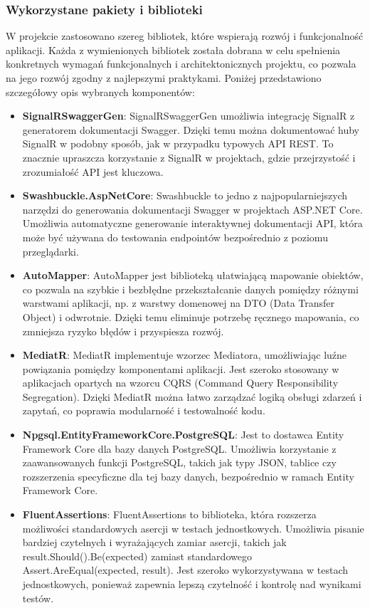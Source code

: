 \documentclass[12pt,a4paper]{article}
\begin{document}
\newpage

\subsubsection{Wykorzystane pakiety i biblioteki}

W projekcie zastosowano szereg bibliotek, które wspierają rozwój i funkcjonalność aplikacji. Każda z wymienionych bibliotek została dobrana w celu spełnienia konkretnych wymagań funkcjonalnych i architektonicznych projektu, co pozwala na jego rozwój zgodny z najlepszymi praktykami. Poniżej przedstawiono szczegółowy opis wybranych komponentów:
\begin{itemize}
    \item \textbf{SignalRSwaggerGen}: SignalRSwaggerGen umożliwia integrację SignalR z generatorem dokumentacji Swagger. Dzięki temu można dokumentować huby SignalR w podobny sposób, jak w przypadku typowych API REST. To znacznie upraszcza korzystanie z SignalR w projektach, gdzie przejrzystość i zrozumiałość API jest kluczowa.
    \item \textbf{Swashbuckle.AspNetCore}: Swashbuckle to jedno z najpopularniejszych narzędzi do generowania dokumentacji Swagger w projektach ASP.NET Core. Umożliwia automatyczne generowanie interaktywnej dokumentacji API, która może być używana do testowania endpointów bezpośrednio z poziomu przeglądarki.
    \item \textbf{AutoMapper}: AutoMapper jest biblioteką ułatwiającą mapowanie obiektów, co pozwala na szybkie i bezbłędne przekształcanie danych pomiędzy różnymi warstwami aplikacji, np. z warstwy domenowej na DTO (Data Transfer Object) i odwrotnie. Dzięki temu eliminuje potrzebę ręcznego mapowania, co zmniejsza ryzyko błędów i przyspiesza rozwój.
    \item \textbf{MediatR}: MediatR implementuje wzorzec Mediatora, umożliwiając luźne powiązania pomiędzy komponentami aplikacji. Jest szeroko stosowany w aplikacjach opartych na wzorcu CQRS (Command Query Responsibility Segregation). Dzięki MediatR można łatwo zarządzać logiką obsługi zdarzeń i zapytań, co poprawia modularność i testowalność kodu.
    \item \textbf{Npgsql.EntityFrameworkCore.PostgreSQL}: Jest to dostawca Entity Framework Core dla bazy danych PostgreSQL. Umożliwia korzystanie z zaawansowanych funkcji PostgreSQL, takich jak typy JSON, tablice czy rozszerzenia specyficzne dla tej bazy danych, bezpośrednio w ramach Entity Framework Core.
    \item \textbf{FluentAssertions}: FluentAssertions to biblioteka, która rozszerza możliwości standardowych asercji w testach jednostkowych. Umożliwia pisanie bardziej czytelnych i wyrażających zamiar asercji, takich jak result.Should().Be(expected) zamiast standardowego Assert.AreEqual(expected, result). Jest szeroko wykorzystywana w testach jednostkowych, ponieważ zapewnia lepszą czytelność i kontrolę nad wynikami testów.


\end{itemize}
\end{document}
